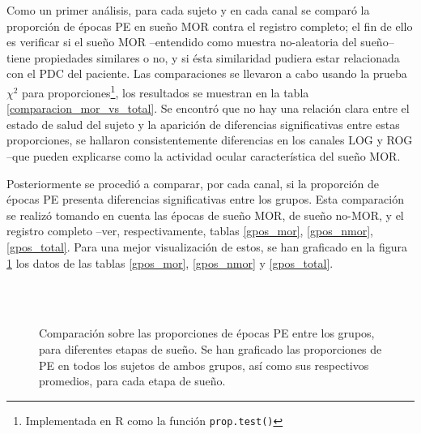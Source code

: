 Como un primer an\'alisis, para cada sujeto y en cada canal 
se compar\'o la proporci\'on de \'epocas PE en sue\~no MOR contra el registro completo;
el fin de ello es verificar si el sue\~no MOR --entendido como muestra no-aleatoria
del sue\~no-- tiene propiedades similares o no, y si \'esta similaridad pudiera estar
relacionada con el PDC del paciente. 
Las comparaciones se llevaron a cabo usando la prueba $\chi^{2}$ para 
proporciones\footnote{Implementada en R como la funci\'on \texttt{prop.test()}},
los resultados se muestran en la tabla \ref{comparacion_mor_vs_total}.
Se encontr\'o que no hay una relaci\'on clara entre el estado de salud del sujeto y
la aparici\'on de diferencias significativas entre estas proporciones, se hallaron
consistentemente diferencias en los canales LOG y ROG --que pueden explicarse como la actividad
ocular caracter\'istica del sue\~no MOR.


Posteriormente se procedi\'o a comparar, por cada canal, si la proporci\'on de \'epocas PE
presenta diferencias significativas entre los grupos. Esta comparaci\'on se realiz\'o tomando
en cuenta las \'epocas de sue\~no MOR, de sue\~no no-MOR, y el registro completo 
--ver, respectivamente, tablas \ref{gpos_mor}, \ref{gpos_nmor}, \ref{gpos_total}.
Para una mejor visualizaci\'on de estos, se han graficado
en la figura \ref{comparacion_graf}
los datos de las tablas \ref{gpos_mor}, \ref{gpos_nmor} y
\ref{gpos_total}.

\begin{figure}
\centering
{}\\
\\
\caption{Comparaci\'on sobre las proporciones de \'epocas PE entre los grupos, para diferentes
etapas de sue\~no. Se han graficado las proporciones de PE en todos los sujetos de ambos grupos,
as\'i como sus respectivos promedios, para cada etapa de sue\~no.}
\label{comparacion_graf}
\end{figure}


